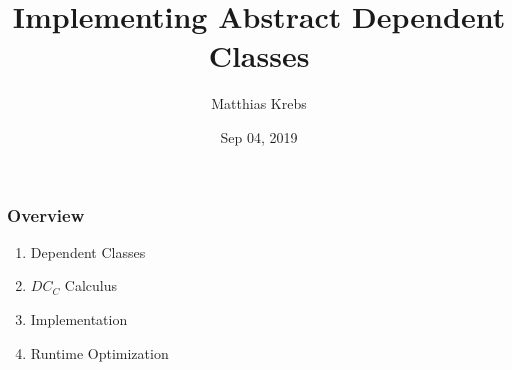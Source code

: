 \documentclass[leqno]{beamer}
\title{Implementing Abstract Dependent Classes}
\author{Matthias Krebs}
\date{Sep 04, 2019}
\begin{document}
\maketitle

\begin{frame}
\frametitle{Overview}

\begin{enumerate}
  \item Dependent Classes
  \item $DC_C$ Calculus
  \item Implementation
  \item Runtime Optimization %
\end{enumerate}
\end{frame}








\end{document}
